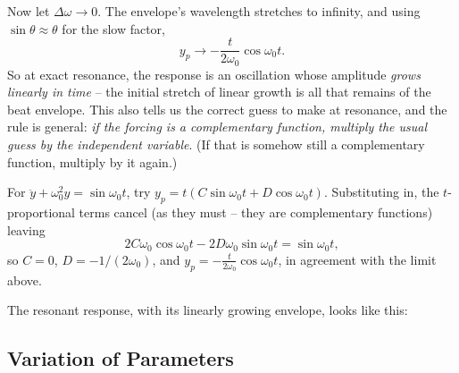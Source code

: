 \documentclass[a4paper]{scrartcl}
\begin{document}
\begin{center}
\end{center}

Now let $\Delta \omega \to 0$. The envelope's wavelength stretches to infinity, and using $\sin \theta \approx \theta$ for the slow factor,
$$
y_p \to -\frac{t}{2\omega_0} \cos \omega_0 t.
$$
So at exact resonance, the response is an oscillation whose amplitude \emph{grows linearly in time} -- the initial stretch of linear growth is all that remains of the beat envelope. This also tells us the correct guess to make at resonance, and the rule is general: \emph{if the forcing is a complementary function, multiply the usual guess by the independent variable}. (If that is somehow still a complementary function, multiply by it again.)

\begin{example}
	For $\ddot y + \omega_0^2 y = \sin \omega_0 t$, try $y_p = t(C \sin \omega_0 t + D \cos \omega_0 t)$. Substituting in, the $t$-proportional terms cancel (as they must -- they are complementary functions) leaving
	$$
	2 C \omega_0 \cos \omega_0 t - 2D\omega_0 \sin \omega_0 t = \sin \omega_0 t,
	$$
	so $C = 0$, $D = -1/(2\omega_0)$, and $y_p = -\frac{t}{2\omega_0}\cos \omega_0 t$, in agreement with the limit above.
\end{example}

The resonant response, with its linearly growing envelope, looks like this:

\begin{center}
\end{center}

\subsection{Variation of Parameters}
\end{document}
